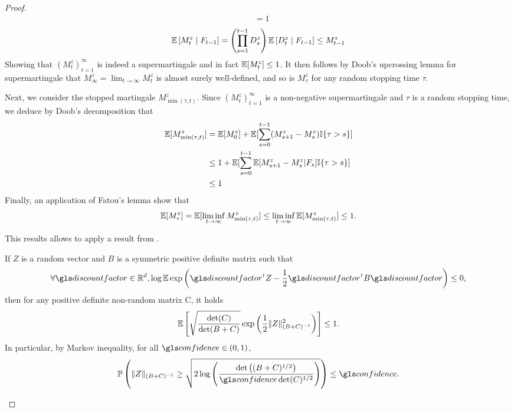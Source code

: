 \begin{subappendices}
\begin{proof}
\begin{align*}
		&= 1
		\end{align*}
		\begin{align*}
		\operatorname*{\mathbb{E}}\left[M_t^z \;\middle|\; F_{t-1}\right] = \left(\prod_{s=1}^{t-1} D_s^z\right) \operatorname*{\mathbb{E}}\left[D_t^z \;\middle|\; F_{t-1}\right] \leq M_{t-1}^z
		\end{align*}
		Showing that $(M_t^z)_{t=1}^\infty$ is indeed a supermartingale and in fact $\operatorname*{\mathbb{E}}[M_t^z]\leq 1$.
		It then follows by Doob's upcrossing lemma for supermartingale that $M_\infty^z = \lim_{t\to\infty} M_t^z$ is almost surely well-defined, and so is $M_\tau^z$ for any random stopping time $\tau$.
		
		Next, we consider the stopped martingale $M_{\min(\tau,t)}^z$. Since 
		$(M_t^z)_{t=1}^\infty$ is a non-negative supermartingale and $\tau$ is a random stopping time, we deduce by Doob's decomposition that
		\begin{align*}
		\operatorname*{\mathbb{E}}[M_{\min(\tau,t)}^z] &= \operatorname*{\mathbb{E}}[M_0^z] + \operatorname*{\mathbb{E}}[\sum_{s=0}^{t-1} (M_{s+1}^z-M_s^z) \mathbb{I}\{\tau>s\}]\\
		&\leq 1 + \operatorname*{\mathbb{E}}[\sum_{s=0}^{t-1} \operatorname*{\mathbb{E}}[M_{s+1}^z-M_s^z|F_{s}] \mathbb{I}\{\tau>s\}]\\
		&\leq 1
		\end{align*}
		Finally, an application of Fatou's lemma show that 
		$$\operatorname*{\mathbb{E}}[M_\tau^z] = \operatorname*{\mathbb{E}}[\liminf_{t\to\infty} M_{\min(\tau,t)}^z] \leq \liminf_{t\to\infty} \operatorname*{\mathbb{E}}[M_{\min(\tau,t)}^z] \leq 1.$$
		
		This results allows to apply a result from \citep{pena2008self}.
		\begin{lemma}
			\begin{leftbar}[lemmabar]
			If $Z$ is a random vector and $B$ is a symmetric positive definite matrix such that
			\[\forall \discount\in\Real^d, \log \expectedvalue \exp \left(\discount^\transp Z -\frac{1}{2} \discount^\transp B \discount \right)\leq 0,\]
			then for any positive definite non-random matrix C, it holds
			\[\operatorname*{\mathbb{E}}\left[ \sqrt{\frac{\det(C)}{\det(B+C)} } \exp\left( \frac{1}{2}\|Z\|^2_{(B+C)^{-1}}\right)\right]\leq 1. \] 
			In particular, by Markov inequality, for all $\confidence\in(0,1)$, 
			\[\probability{\|Z\|_{(B+C)^{-1}} \geq \sqrt{2\log \left(\frac{\det \left((B+C)^{1/2}\right)}{\confidence\det(C)^{1/2}}\right)}}\leq \confidence.\]
			\end{leftbar}
		\end{lemma}
		

\end{proof}
\end{subappendices}
